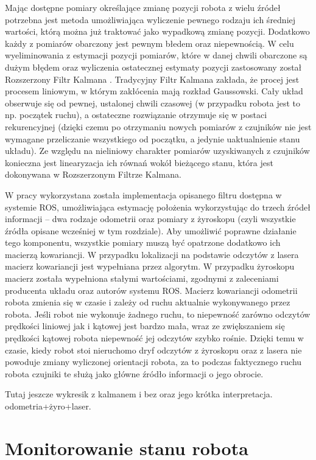 Mając dostępne pomiary określające zmianę pozycji robota z wielu źródeł potrzebna jest metoda
umożliwiająca wyliczenie pewnego rodzaju ich średniej wartości, którą można już traktować
jako wypadkową zmianę pozycji. Dodatkowo każdy z pomiarów obarczony jest pewnym błedem oraz
niepewnością. W celu wyeliminowania z estymacji pozycji pomiarów, które w danej chwili
obarczone są dużym błędem oraz wyliczenia ostatecznej estymaty pozycji zastosowany został
Rozszerzony Filtr Kalmana \cite{Thrun:2005:PR:1121596}. Tradycyjny Filtr Kalmana zakłada, że procej jest procesem
liniowym, w którym zakłócenia mają rozkład Gaussowski. Cały układ obserwuje się od pewnej,
ustalonej chwili czasowej (w przypadku robota jest to np. początek ruchu), a ostateczne
rozwiązanie otrzymuje się w postaci rekurencyjnej (dzięki czemu po otrzymaniu nowych pomiarów
z czujników nie jest wymagane przeliczanie wszystkiego od początku, a jedynie uaktualnienie
stanu układu). Ze względu na nieliniowy charakter pomiarów uzyskiwanych z czujników
konieczna jest linearyzacja ich równań wokół bieżącego stanu, która jest dokonywana w
Rozszerzonym Filtrze Kalmana.

W pracy wykorzystana została implementacja opisanego filtru dostępna w systemie ROS,
umożliwiająca estymację położenia wykorzystując do trzech źródeł informacji -- dwa rodzaje
odometrii oraz pomiary z żyroskopu (czyli wszystkie źródła opisane wcześniej w tym rozdziale).
Aby umożliwić poprawne działanie tego komponentu, wszystkie pomiary muszą być opatrzone
dodatkowo ich macierzą kowariancji. W przypadku lokalizacji na podstawie odczytów z lasera
macierz kowariancji jest wypełniana przez algorytm. W przypadku żyroskopu macierz
została wypełniona stałymi wartościami, zgodnymi z zaleceniami producenta układu oraz
autorów systemu ROS. Macierz kowariancji odometrii robota zmienia się w czasie i zależy
od ruchu aktualnie wykonywanego przez robota. Jeśli robot nie wykonuje żadnego ruchu,
to niepewność zarówno odczytów prędkości liniowej jak i kątowej jest bardzo mała,
wraz ze zwiększaniem się prędkości kątowej robota niepewność jej odczytów szybko rośnie.
Dzięki temu w czasie, kiedy robot stoi nieruchomo dryf odczytów z żyroskopu oraz z lasera
nie powoduje zmiany wyliczonej orientacji robota, za to podczas faktycznego ruchu robota
czujniki te służą jako główne źródło informacji o jego obrocie.

Tutaj jeszcze wykresik z kalmanem i bez oraz jego krótka interpretacja.
odometria+żyro+laser.

\section{Monitorowanie stanu robota}

